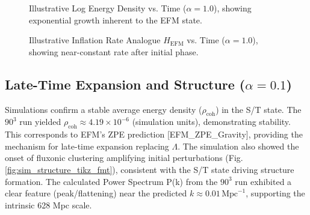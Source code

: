 \documentclass[11pt]{article}
\begin{document}
\begin{figure}[htbp] %
    \centering
    \caption{Illustrative Log Energy Density vs. Time (\(\alpha=1.0\)), showing exponential growth inherent to the EFM state.}
    \label{fig:sim_rho_growth_tikz_fmt}
\end{figure}

\begin{figure}[htbp] %
    \centering
    \caption{Illustrative Inflation Rate Analogue \(H_{\text{EFM}}\) vs. Time (\(\alpha=1.0\)), showing near-constant rate after initial phase.}
    \label{fig:sim_H_rate_tikz_fmt}
\end{figure}

\subsection{Late-Time Expansion and Structure (\(\alpha=0.1\))}
Simulations confirm a stable average energy density (\(\rho_{\text{coh}}\)) in the S/T state. The \(90^3\) run yielded \(\rho_{\text{coh}} \approx 4.19 \times 10^{-6}\) (simulation units), demonstrating stability. This corresponds to EFM's ZPE prediction [EFM\_ZPE\_Gravity], providing the mechanism for late-time expansion replacing \(\Lambda\). The simulation also showed the onset of fluxonic clustering amplifying initial perturbations (Fig. \ref{fig:sim_structure_tikz_fmt}), consistent with the S/T state driving structure formation. The calculated Power Spectrum P(k) from the \(90^3\) run exhibited a clear feature (peak/flattening) near the predicted \(k \approx 0.01 \, \text{Mpc}^{-1}\), supporting the intrinsic 628 Mpc scale.
\end{document}
